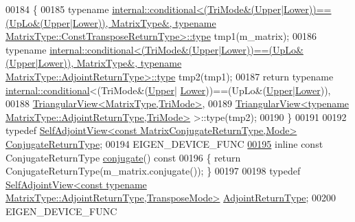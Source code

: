 \begin{DoxyCode}
00184 \textcolor{keyword}{    }\{
00185       \textcolor{keyword}{typename} 
      \hyperlink{class_eigen_1_1internal_1_1_tensor_lazy_evaluator_writable}{internal::conditional<(TriMode&(Upper|Lower))==(UpLo&(Upper|Lower)), MatrixType&, typename
       MatrixType::ConstTransposeReturnType>::type}
       tmp1(m\_matrix);
00186       \textcolor{keyword}{typename} 
      \hyperlink{class_eigen_1_1internal_1_1_tensor_lazy_evaluator_writable}{internal::conditional<(TriMode&(Upper|Lower))==(UpLo&(Upper|Lower)), MatrixType&, typename
       MatrixType::AdjointReturnType>::type}
       tmp2(tmp1);
00187       \textcolor{keywordflow}{return} \textcolor{keyword}{typename} \hyperlink{struct_eigen_1_1internal_1_1conditional}{internal::conditional}<(TriMode&(\hyperlink{group__enums_gga39e3366ff5554d731e7dc8bb642f83cda6bcb58be3b8b8ec84859ce0c5ac0aaec}{Upper}|
      \hyperlink{group__enums_gga39e3366ff5554d731e7dc8bb642f83cda891792b8ed394f7607ab16dd716f60e6}{Lower}))==(UpLo&(\hyperlink{group__enums_gga39e3366ff5554d731e7dc8bb642f83cda6bcb58be3b8b8ec84859ce0c5ac0aaec}{Upper}|\hyperlink{group__enums_gga39e3366ff5554d731e7dc8bb642f83cda891792b8ed394f7607ab16dd716f60e6}{Lower})),
00188                                    \hyperlink{group___core___module_class_eigen_1_1_triangular_view}{TriangularView<MatrixType,TriMode>},
00189                                    
      \hyperlink{group___core___module_class_eigen_1_1_triangular_view}{TriangularView<typename MatrixType::AdjointReturnType,TriMode>}
       >::type(tmp2);
00190     \}
00191 
00192     \textcolor{keyword}{typedef} \hyperlink{group___core___module_class_eigen_1_1_self_adjoint_view}{SelfAdjointView<const MatrixConjugateReturnType,Mode>}
       \hyperlink{group___core___module_class_eigen_1_1_self_adjoint_view}{ConjugateReturnType};
00194     EIGEN\_DEVICE\_FUNC
\hyperlink{group___core___module_aee8afbae3643e8af7cdfb5791404fc22}{00195}     \textcolor{keyword}{inline} \textcolor{keyword}{const} ConjugateReturnType \hyperlink{group___core___module_aee8afbae3643e8af7cdfb5791404fc22}{conjugate}()\textcolor{keyword}{ const}
00196 \textcolor{keyword}{    }\{ \textcolor{keywordflow}{return} ConjugateReturnType(m\_matrix.conjugate()); \}
00197 
00198     \textcolor{keyword}{typedef} 
      \hyperlink{group___core___module_class_eigen_1_1_self_adjoint_view}{SelfAdjointView<const typename MatrixType::AdjointReturnType,TransposeMode>}
       \hyperlink{group___core___module_class_eigen_1_1_self_adjoint_view}{AdjointReturnType};
00200     EIGEN\_DEVICE\_FUNC

\end{DoxyCode}
